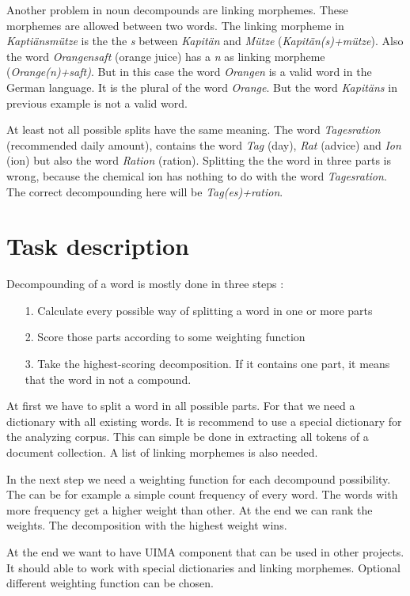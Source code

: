 \documentclass[11pt, accentcolor=tud9b, nochapname]{tudreport}
\begin{document}
Another problem in noun decompounds are linking morphemes. These
morphemes are allowed between two words. The linking morpheme in
\emph{Kaptiänsmütze} is the the \emph{s} between \emph{Kapitän} and
\emph{Mütze} (\emph{Kapitän(s)+mütze}). Also the word
\emph{Orangensaft} (orange juice) has a \emph{n} as linking morpheme
(\emph{Orange(n)+saft)}. But in this case the word \emph{Orangen} is a
valid word in the German language. It is the plural of the word
\emph{Orange}. But the word \emph{Kapitäns} in previous example is not
a valid word.

At least not all possible splits have the same meaning. The word
\emph{Tagesration} (recommended daily amount), contains the word
\emph{Tag} (day), \emph{Rat} (advice) and \emph{Ion} (ion) but also
the word \emph{Ration} (ration). Splitting the the word in three
parts is wrong, because the chemical ion has nothing to do with the
word \emph{Tagesration}. The correct decompounding here will be
\emph{Tag(es)+ration}.

\section{Task description}
Decompounding of a word is mostly done in three steps \cite{alf2008}:

\begin{enumerate}
\item[1.] Calculate every possible way of splitting a word in one or more
  parts
\item[2.] Score those parts according to some weighting function
\item[3.] Take the highest-scoring decomposition. If it contains one part,
  it means that the word in not a compound.
\end{enumerate}

At first we have to split a word in all possible parts. For that we
need a dictionary with all existing words. It is recommend to use a
special dictionary for the analyzing corpus. This can simple be done
in extracting all tokens of a document collection. A list of linking
morphemes is also needed.

In the next step we need a weighting function for each decompound
possibility. The can be for example a simple count frequency of every
word. The words with more frequency get a higher weight than other. At
the end we can rank the weights. The decomposition with the highest
weight wins.

At the end we want to have UIMA component that can be used in other
projects. It should able to work with special dictionaries and linking
morphemes. Optional different weighting function can be chosen.
\end{document}

